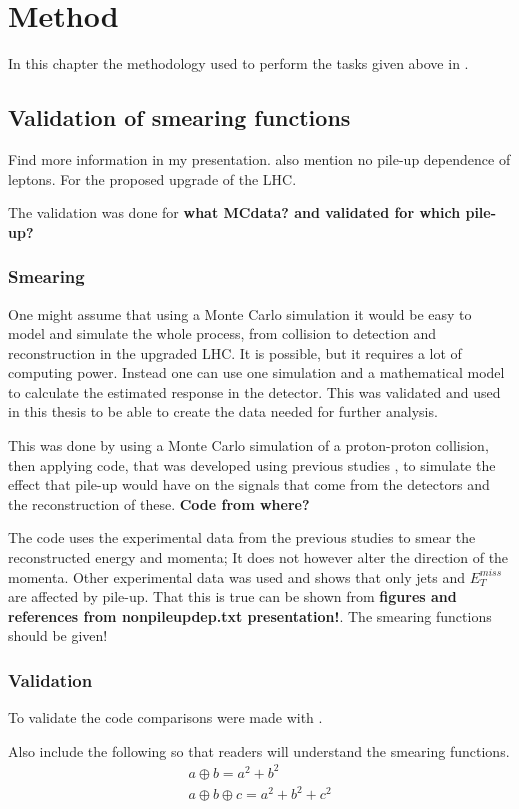 \chapter{Method}\label{cha:meth}
In this chapter the methodology used to perform the tasks given above in .
\newpage
\section{Validation of smearing functions}
Find more information in my presentation. also mention no pile-up dependence of leptons.
For the proposed upgrade of the LHC.

The validation was done for \textbf{what MCdata? and validated for which pile-up?}

\subsection{Smearing}
One might assume that using a Monte Carlo simulation it would be easy to model and simulate the whole process, from collision to detection and reconstruction in the upgraded LHC. It is possible, but it requires a lot of computing power. Instead one can use one simulation and a mathematical model to calculate the estimated response in the detector. This was validated and used in this thesis to be able to create the data needed for further analysis. 

This was done by using a Monte Carlo simulation of a proton-proton collision, then applying code, that was developed using previous studies \citep{ATL-PHYS-PUB-2013-004} , to simulate the effect that pile-up would have on the signals that come from the detectors and the reconstruction of these. \textbf{Code from where?}

The code uses the experimental data from the previous studies to smear the reconstructed energy and momenta; It does not however alter the direction of the momenta. Other experimental data was used and shows that only jets and $E^{miss}_T$ are affected by pile-up. That this is true can be shown from \textbf{figures and references from nonpileupdep.txt presentation!}. The smearing functions should be given!

\subsection{Validation}
To validate the code comparisons were made with \citep{ATL-PHYS-PUB-2013-004}. 

Also include the following so that readers will understand the smearing functions.
\begin{eqnarray}
a\oplus b = a^2 + b^2 \\
a\oplus b\oplus c = a^2+b^2+c^2 
\end{eqnarray}

